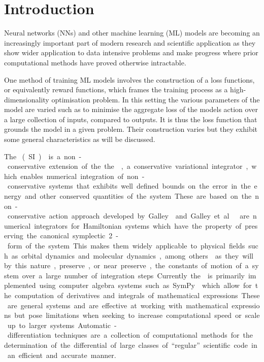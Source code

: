 \section{Introduction}

Neural networks (NNs) and other machine learning (ML) models are becoming an increasingly important part of modern research and scientific application as they show wider application to data intensive problems and make progress where prior computational methods have proved otherwise intractable.

One method of training ML models involves the construction of a loss functions, or equivalently reward functions, which frames the training process as a high-dimensionality optimisation problem. In this setting the various parameters of the model are varied such as to minimise the aggregate loss of the models action over a large collection of inputs, compared to outputs. It is thus the loss function that grounds the model in a given problem. Their construction varies but they exhibit some general characteristics as will be discussed.

The \SI{} (SI)\cite{tsangSLIMPLECTICINTEGRATORSVARIATIONAL2015} is a non-conservative extension of the the \SymI{}, a conservative variational integrator, which enables numerical integration of non-conservative systems that exhibits well defined bounds on the error in the energy and other conserved quantities of the system. These are based on the non-conservative action approach developed by Galley\cite{galleyClassicalMechanicsNonconservative2013} and Galley et al.\cite{galleyPrincipleStationaryNonconservative2014}.

\SymI{} are numerical integrators for Hamiltonian systems which have the property of preserving the canonical symplectic 2-form of the system. %
This makes them widely applicable to physical fields such as orbital dynamics and  molecular dynamics, among others  as they will by this nature,  preserve, or near preserve, the constants of motion of a system over a large number of integration steps.


Currently the \SI{} is primarily implemented using computer algebra systems such as SymPy\cite{sympy} which allow for the computation of derivatives and integrals of mathematical expressions. These are general systems and are effective at working with mathematical expressions but pose limitations when seeking to increase computational speed or scale up to larger systems. Automatic-differentiation techniques are a collection of computational methods for the determination of the differential of large classes of \enquote{regular} scientific code in an efficient and accurate manner.

